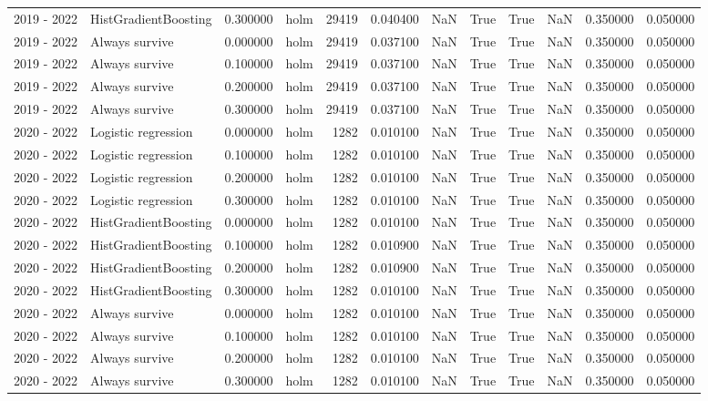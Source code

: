 \begin{tabular}{llrlrrrrrrrr}
2019 - 2022 & HistGradientBoosting & 0.300000 & holm & 29419 & 0.040400 & NaN & True & True & NaN & 0.350000 & 0.050000 \\
2019 - 2022 & Always survive & 0.000000 & holm & 29419 & 0.037100 & NaN & True & True & NaN & 0.350000 & 0.050000 \\
2019 - 2022 & Always survive & 0.100000 & holm & 29419 & 0.037100 & NaN & True & True & NaN & 0.350000 & 0.050000 \\
2019 - 2022 & Always survive & 0.200000 & holm & 29419 & 0.037100 & NaN & True & True & NaN & 0.350000 & 0.050000 \\
2019 - 2022 & Always survive & 0.300000 & holm & 29419 & 0.037100 & NaN & True & True & NaN & 0.350000 & 0.050000 \\
2020 - 2022 & Logistic regression & 0.000000 & holm & 1282 & 0.010100 & NaN & True & True & NaN & 0.350000 & 0.050000 \\
2020 - 2022 & Logistic regression & 0.100000 & holm & 1282 & 0.010100 & NaN & True & True & NaN & 0.350000 & 0.050000 \\
2020 - 2022 & Logistic regression & 0.200000 & holm & 1282 & 0.010100 & NaN & True & True & NaN & 0.350000 & 0.050000 \\
2020 - 2022 & Logistic regression & 0.300000 & holm & 1282 & 0.010100 & NaN & True & True & NaN & 0.350000 & 0.050000 \\
2020 - 2022 & HistGradientBoosting & 0.000000 & holm & 1282 & 0.010100 & NaN & True & True & NaN & 0.350000 & 0.050000 \\
2020 - 2022 & HistGradientBoosting & 0.100000 & holm & 1282 & 0.010900 & NaN & True & True & NaN & 0.350000 & 0.050000 \\
2020 - 2022 & HistGradientBoosting & 0.200000 & holm & 1282 & 0.010900 & NaN & True & True & NaN & 0.350000 & 0.050000 \\
2020 - 2022 & HistGradientBoosting & 0.300000 & holm & 1282 & 0.010100 & NaN & True & True & NaN & 0.350000 & 0.050000 \\
2020 - 2022 & Always survive & 0.000000 & holm & 1282 & 0.010100 & NaN & True & True & NaN & 0.350000 & 0.050000 \\
2020 - 2022 & Always survive & 0.100000 & holm & 1282 & 0.010100 & NaN & True & True & NaN & 0.350000 & 0.050000 \\
2020 - 2022 & Always survive & 0.200000 & holm & 1282 & 0.010100 & NaN & True & True & NaN & 0.350000 & 0.050000 \\
2020 - 2022 & Always survive & 0.300000 & holm & 1282 & 0.010100 & NaN & True & True & NaN & 0.350000 & 0.050000 \\

\end{tabular}

